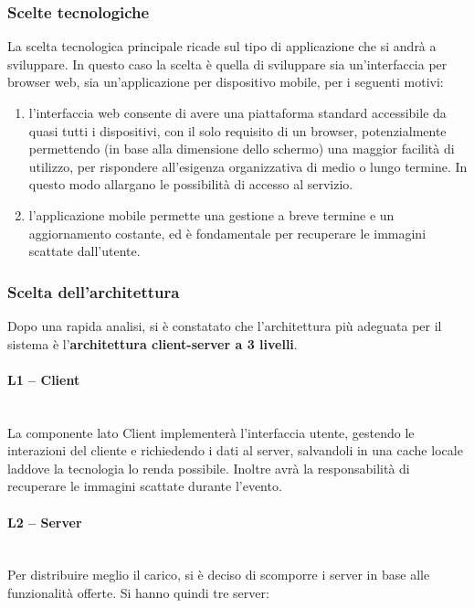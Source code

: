 \subsubsection{Scelte tecnologiche}

La scelta tecnologica principale ricade sul tipo di applicazione che si andrà a
sviluppare.
In questo caso la scelta è quella di sviluppare sia un'interfaccia per browser web, sia un'applicazione per dispositivo mobile, per i seguenti motivi:
\begin{enumerate}
    \item l'interfaccia web consente di avere una
          piattaforma standard accessibile da quasi tutti i dispositivi, con il solo
          requisito di un browser, potenzialmente permettendo (in base alla dimensione dello schermo) una maggior facilità di utilizzo, per rispondere all'esigenza organizzativa di medio o lungo termine.
          In questo modo allargano le possibilità di accesso al servizio.
    \item  l'applicazione mobile permette una gestione a breve termine e un aggiornamento costante, ed è fondamentale per recuperare le immagini scattate dall'utente.
\end{enumerate}
\newpage
\subsubsection{Scelta dell'architettura}

Dopo una rapida analisi, si è constatato che l'architettura più adeguata per il
sistema è l'\textbf{architettura client-server a 3 livelli}.

\paragraph{L1 -- Client}\mbox{}\\
La componente lato Client implementerà l'interfaccia utente, gestendo le interazioni del cliente e richiedendo i dati al server,
salvandoli in una cache locale laddove la tecnologia lo renda possibile. Inoltre avrà la responsabilità di recuperare le immagini scattate durante l'evento.

\paragraph{L2 -- Server}\mbox{}\\
Per distribuire meglio il carico, si è deciso di scomporre i server in base alle funzionalità offerte. Si hanno quindi tre server:

